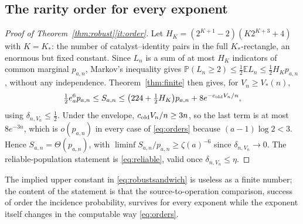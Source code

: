 \documentclass[11pt,letterpaper]{article}
\theoremstyle{plain}
\theoremstyle{definition}
\theoremstyle{remark}
\numberwithin{equation}{section}
\newcommand{\PP}{\mathbb P}
\newcommand{\EE}{\mathbb E}
\begin{document}
\subsection{The rarity order for every exponent}
\begin{proof}[Proof of Theorem~\ref{thm:robust}\ref{it:order}]
Let $H_K=(2^{K+1}-2)(K2^{K+3}+4)$ with $K=K_*$: the number of catalyst--identity pairs in the full $K_*$-rectangle, an enormous but fixed constant. Since $L_n$ is a sum of at most $H_K$ indicators of common marginal $p_{a,n}$, Markov's inequality gives $\PP(L_n\ge2)\le\tfrac12\EE L_n\le\tfrac12H_Kp_{a,n}$, without any independence. Theorem~\ref{thm:finite} then gives, for $V_n\ge V_*(n)$,
\begin{equation}\label{eq:robustsandwich}
 \tfrac12e_a^6p_{a,n}\le S_{a,n}\le\bigl(224+\tfrac12H_K\bigr)p_{a,n}+8e^{-c_{\rm old}V_n/n},
\end{equation}
using $\delta_{n,V_n}\le\tfrac12$. Under the envelope, $c_{\rm old}V_n/n\ge3n$, so the last term is at most $8e^{-3n}$, which is $o(p_{a,n})$ in every case of \eqref{eq:orders} because $(a-1)\log2<3$. Hence $S_{a,n}=\Theta(p_{a,n})$, with $\liminf S_{a,n}/p_{a,n}\ge\zeta(a)^{-6}$ since $\delta_{n,V_n}\to0$. The reliable-population statement is \eqref{eq:reliable}, valid once $\delta_{n,V_n}\le\eta$.
\end{proof}

The implied upper constant in \eqref{eq:robustsandwich} is useless as a finite number; the content of the statement is that the source-to-operation comparison, success of order the incidence probability, survives for every exponent while the exponent itself changes in the computable way \eqref{eq:orders}.
\end{document}
